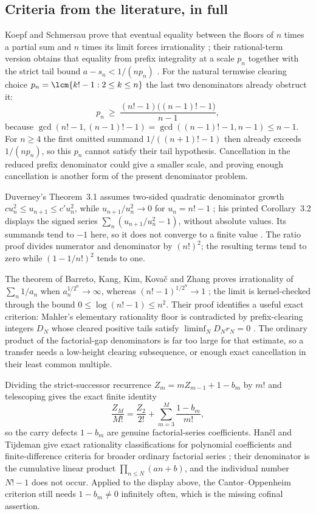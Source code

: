 \subsection{Criteria from the literature, in full}\label{long68:sec:ext-literature}

Koepf and Schmersau prove that eventual equality between the floors of $n$
times a partial sum and $n$ times its limit forces irrationality
\cite[Thm.~1.1, p.~117]{koepf-schmersau}; their rational-term version obtains
that equality from prefix integrality at a scale $p_n$ together with the
strict tail bound $a-s_n<1/(np_n)$
\cite[Thms.~2.2--2.3, pp.~119--120]{koepf-schmersau}.  For the natural
termwise clearing choice $p_n=\lcm\{k!-1:2\le k\le n\}$ the last two
denominators already obstruct it:
\[
 p_n\ \ge\ \frac{(n!-1)\bigl((n-1)!-1\bigr)}{n-1},
\]
because $\gcd(n!-1,(n-1)!-1)=\gcd((n-1)!-1,n-1)\le n-1$.  For $n\ge4$ the
first omitted summand $1/((n+1)!-1)$ then already exceeds $1/(np_n)$, so this
$p_n$ cannot satisfy their tail hypothesis.  Cancellation in the reduced
prefix denominator could give a smaller scale, and proving enough
cancellation is another form of the present denominator problem.

Duverney's Theorem~3.1 assumes two-sided quadratic denominator growth
$cu_n^2\le u_{n+1}\le c'u_n^2$, while $u_{n+1}/u_n^2\to0$ for $u_n=n!-1$
\cite[pp.~275, 285--286]{duverney}; his printed Corollary~3.2 displays the
signed series $\sum_n(u_{n+1}/u_n^2-1)$, without absolute values.  Its
summands tend to $-1$ here, so it does not converge to a finite value
\cite[Cor.~3.2, p.~287]{duverney}.  The ratio proof divides numerator
and denominator by $(n!)^2$; the resulting terms tend to zero while
$(1-1/n!)^2$ tends to one.

The theorem of Barreto, Kang, Kim, Kova\v{c} and Zhang proves irrationality
of $\sum_n1/a_n$ when $a_n^{1/2^n}\to\infty$, whereas $(n!-1)^{1/2^n}\to1$
\cite[Thms.~2--3, pp.~2--4]{barreto-et-al}; the limit is kernel-checked
through the bound $0\le\log(n!-1)\le n^2$.  Their proof identifies a useful
exact criterion: Mahler's elementary rationality floor is contradicted by
prefix-clearing integers $D_N$ whose cleared positive tails satisfy
$\liminf_ND_Nr_N=0$ \cite[Lem.~8 and Prop.~12, pp.~6, 9--12]{barreto-et-al}.
The ordinary product of the factorial-gap denominators is far too large for
that estimate, so a transfer needs a low-height clearing subsequence, or
enough exact cancellation in their least common multiple.

Dividing the strict-successor recurrence $Z_m=mZ_{m-1}+1-b_m$ by $m!$ and
telescoping gives the exact finite identity
\[
 \frac{Z_M}{M!}=\frac{Z_2}{2!}+\sum_{m=3}^{M}\frac{1-b_m}{m!},
\]
so the carry defects $1-b_m$ are genuine factorial-series coefficients.
Han\v{c}l and Tijdeman give exact rationality classifications for polynomial
coefficients and finite-difference criteria for broader ordinary factorial
series \cite[Thm.~3.1 and Cor.~3.1, pp.~390--391]{hancl-tijdeman}; their
denominator is the cumulative linear product $\prod_{n\le N}(an+b)$, and the
individual number $N!-1$ does not occur.  Applied to the display above, the Cantor--Oppenheim criterion
still needs $1-b_m\ne0$ infinitely often, which is the missing cofinal
assertion.

